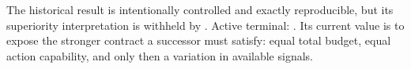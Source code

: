 \markdownRendererOlEndTight \markdownRendererInterblockSeparator
{}The historical result is intentionally controlled and exactly reproducible, but its superiority interpretation is withheld by . Active terminal: . Its current value is to expose the stronger contract a successor must satisfy: equal total budget, equal action capability, and only then a variation in available signals.
\markdownRendererSectionEnd \markdownRendererDocumentEnd